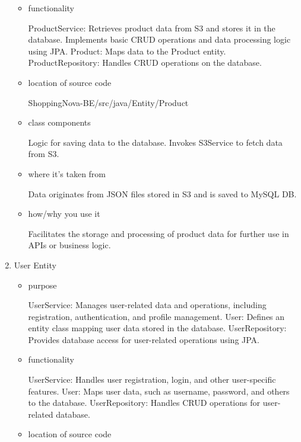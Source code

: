 \documentclass[conference]{IEEEtran}
\begin{document}
\begin{enumerate}
\begin{itemize}
\item functionality

ProductService: Retrieves product data from S3 and stores it in the database. Implements basic CRUD operations and data processing logic using JPA.\newline
Product: Maps data to the Product entity.\newline
ProductRepository: Handles CRUD operations on the database.

\item location of source code

ShoppingNova-BE/src/java/Entity/Product

\item class components

Logic for saving data to the database. \newline Invokes S3Service to fetch data from S3.

\item where it's taken from

Data originates from JSON files stored in S3 and is saved to MySQL DB.

\item how/why you use it

Facilitates the storage and processing of product data for further use in APIs or business logic.

\end{itemize}

\item User Entity

\begin{itemize}
\item purpose

UserService: Manages user-related data and operations, including registration, authentication, and profile management.\newline
User: Defines an entity class mapping user data stored in the database.\newline
UserRepository: Provides database access for user-related operations using JPA.

\item functionality

UserService: Handles user registration, login, and other user-specific features.
User: Maps user data, such as username, password, and others to the database.\newline
UserRepository: Handles CRUD operations for user-related database.

\item location of source code


\end{itemize}
\end{enumerate}
\end{document}
